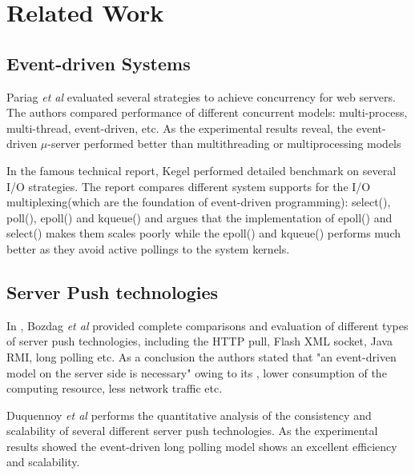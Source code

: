 \section{Related Work\\}

\subsection{Event-driven Systems\\}

Pariag \emph{et al} \cite{David} evaluated several strategies to achieve concurrency
for web servers. The authors compared performance of different concurrent models:
multi-process, multi-thread, event-driven, etc.  As the experimental 
results reveal, the event-driven $\mu$-server performed better than 
multithreading or multiprocessing models
    
In the famous technical report\cite{C10K}, Kegel performed detailed
benchmark on several I/O strategies. The report compares different 
system supports for the I/O multiplexing(which are the foundation
of event-driven programming): select(), poll(), epoll() and kqueue() 
and argues that the implementation of epoll() and select() makes them
scales poorly while the epoll() and kqueue() performs much better as
they avoid active pollings to the system kernels.

\subsection{Server Push technologies\\}

In \cite{Engin}, Bozdag \emph{et al} provided complete comparisons 
and evaluation of different types of server push technologies, including the 
HTTP pull, Flash XML socket, Java RMI, long polling etc. As a conclusion the
authors stated that "an event-driven model on the server side is necessary" 
owing to its , lower consumption of the computing resource, less network
traffic etc.

Duquennoy \emph{et al} \cite{duquennoy09consistency} performs the quantitative 
analysis of the consistency and scalability of several different server
push technologies. As the experimental results showed the event-driven
long polling model shows an excellent efficiency and scalability.

